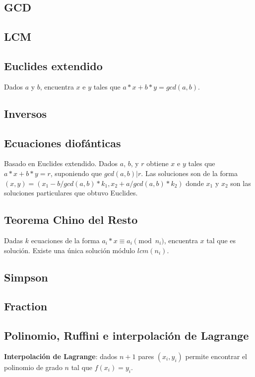 \subsection{GCD}
\subsection{LCM}
\subsection{Euclides extendido}
Dados $a$ y $b$, encuentra $x$ e $y$ tales que $a*x + b*y = gcd(a, b)$.
\subsection{Inversos}
\subsection{Ecuaciones diofánticas}
Basado en Euclides extendido. Dados $a$, $b$, y $r$ obtiene $x$ e $y$ tales que $a*x + b*y = r$, suponiendo que $gcd(a,b) | r$. Las soluciones son de la forma $(x, y) = (x_1 - b/gcd(a,b) * k_1, x_2 + a/gcd(a,b) * k_2)$ donde $x_1$ y $x_2$ son las soluciones particulares que obtuvo Euclides.
\subsection{Teorema Chino del Resto}
Dadas $k$ ecuaciones de la forma $a_i*x \equiv a_i \pmod {n_i}$, encuentra $x$ tal que es solución. Existe una única solución módulo $lcm(n_i)$.
\subsection{Simpson}
\subsection{Fraction}
\subsection{Polinomio, Ruffini e interpolación de Lagrange}
\textbf{Interpolación de Lagrange}: dados $n+1$ pares $(x_i, y_i)$  permite encontrar el polinomio de grado $n$ tal que $f(x_i) = y_i$. 

